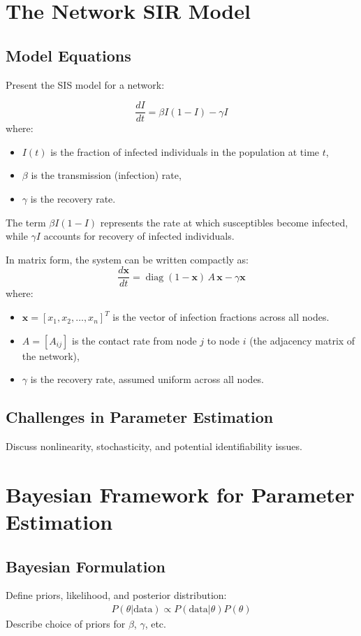 \documentclass[a4paper,10pt]{report}
\begin{document}
\section{The Network SIR Model}
\subsection{Model Equations}
Present the SIS model for a network:

\[
\boxed{
\frac{dI}{dt} = \beta I (1 - I) - \gamma I
}
\]
where:
\begin{itemize}
    \item $I(t)$ is the fraction of infected individuals in the population at time $t$,
    \item $\beta$ is the transmission (infection) rate,
    \item $\gamma$ is the recovery rate.
\end{itemize}

The term $\beta I (1 - I)$ represents the rate at which susceptibles become infected, while $\gamma I$ accounts for recovery of infected individuals.



In matrix form, the system can be written compactly as:
\[
\boxed{
\frac{d\mathbf{x}}{dt} = \operatorname{diag}(1 - \mathbf{x}) \, A \, \mathbf{x} - \gamma \mathbf{x}
}
\]
where: 
\begin{itemize}
    \item $\mathbf{x} = [x_1, x_2, \dots, x_n]^T$ is the vector of infection fractions across all nodes.
    \item $A = [A_{ij}]$ is the contact rate from node $j$ to node $i$ (the adjacency matrix of the network),
    \item $\gamma$ is the recovery rate, assumed uniform across all nodes.
\end{itemize}


\subsection{Challenges in Parameter Estimation}
Discuss nonlinearity, stochasticity, and potential identifiability issues.

\section{Bayesian Framework for Parameter Estimation}
\subsection{Bayesian Formulation}
Define priors, likelihood, and posterior distribution:
\begin{align*}
    P(\theta | \text{data}) \propto P(\text{data} | \theta) P(\theta)
\end{align*}
Describe choice of priors for $\beta$, $\gamma$, etc.
\end{document}
